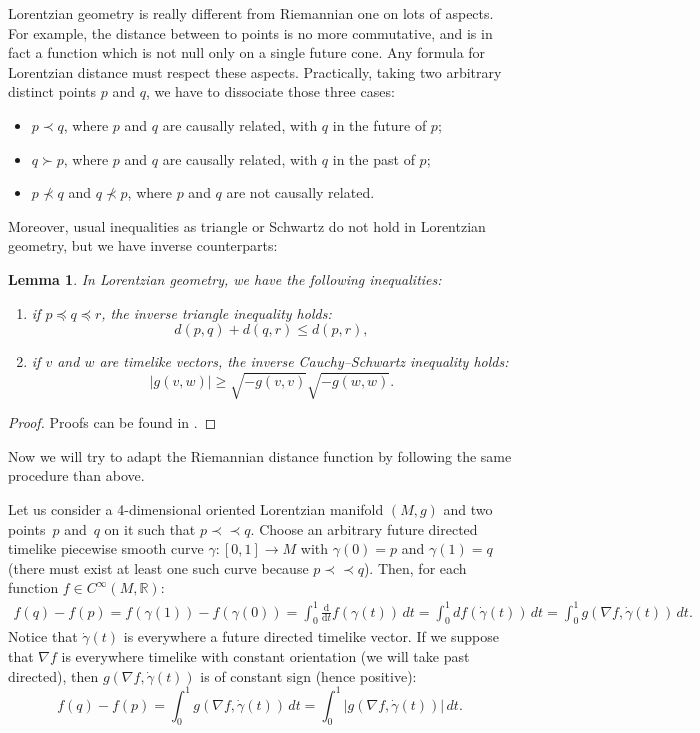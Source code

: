 \documentclass[11pt]{article}
\newtheorem{lemma}{Lemma}
\newcommand{\abs}[1]{\left\vert {#1} \right\vert}
\newcommand{\dv}[2]{\frac{\mathrm d{#1}}{\mathrm d{#2}}}
\newcommand{\setR}{{\mathbb R}}
\newcommand{\precc}{\prec\!\!\prec}
\begin{document}
Lorentzian geometry is really dif\/ferent from Riemannian one on lots of aspects. For example, the distance between to points is no more commutative, and is in fact a function which is not null only on a single future cone. Any formula for Lorentzian distance must respect these aspects. Practically, taking two arbitrary distinct points $p$ and $q$, we have to dissociate those three cases:
\begin{itemize}\itemsep=0pt
\item $p \prec q$, where $p$ and $q$ are causally related, with $q$ in the future of $p$;
\item $q \succ p$, where $p$ and $q$ are causally related, with $q$ in the past of $p$;
\item $p \nprec q$ and $q \nprec p$, where $p$ and $q$ are not causally related.
\end{itemize}

Moreover, usual inequalities as triangle or Schwartz do not hold in Lorentzian geometry, but we have inverse counterparts:

\begin{lemma}
In Lorentzian geometry, we have the following inequalities:
\begin{enumerate}\itemsep=0pt
\item if $p \preceq q \preceq r$, the inverse triangle inequality holds:
\[
d(p,q) + d(q,r) \leq d(p,r),
\]
\item if $v$ and $w$ are timelike vectors, the inverse Cauchy--Schwartz inequality holds:
\[
\abs{g(v,w)} \geq \sqrt{- g(v,v)} \sqrt{- g(w,w)}.
\]
\end{enumerate}
\end{lemma}

\begin{proof}
Proofs can be found in \cite{Beem,ONeill}.
\end{proof}

Now we will try to adapt the Riemannian distance function by following the same procedure than above.

Let us consider a 4-dimensional oriented Lorentzian manifold $(M,g)$ and two points~$p$ and~$q$ on it such that $p \precc q$. Choose an arbitrary future directed timelike piecewise smooth curve $\gamma : [0,1] \rightarrow M$ with $\gamma(0) = p$ and $\gamma(1) = q$ (there must exist at least one such curve because $p \precc q$). Then, for each function $f \in C^\infty(M,\setR)$:
\begin{gather*}
f(q) - f(p) = f(\gamma(1)) - f(\gamma(0)) = \int_0^1 \dv{}{t} f(\gamma(t)) \, dt = \int_0^1 df(\dot\gamma(t)) \, dt = \int_0^1  g( \nabla f,\dot\gamma(t)) \, dt.
\end{gather*}
Notice that $\dot\gamma(t)$ is everywhere a future directed timelike vector. If we suppose that $\nabla f$ is everywhere timelike with constant orientation (we will take past directed), then $g( \nabla f,\dot\gamma(t))$ is of constant sign (hence positive):
\[
f(q) - f(p) = \int_0^1  g( \nabla f,\dot\gamma(t)) \, dt = \int_0^1 \abs{ g( \nabla f,\dot\gamma(t)) }\, dt.
\]
\end{document}
